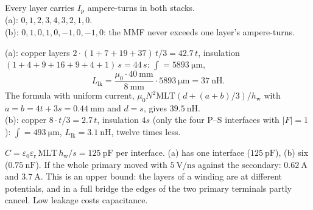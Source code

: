 


\begin{solutionblock}
	Every layer carries $I_\mathrm{p}$ ampere-turns in both stacks.\\
	(a): $0,1,2,3,4,3,2,1,0$.\\
	(b): $0,1,0,1,0,-1,0,-1,0$: the MMF never exceeds one layer's ampere-turns.
\end{solutionblock}


\begin{solutionblock}
	(a): copper layers $2\cdot(1+7+19+37)\,t/3=42.7\,t$, insulation $(1+4+9+16+9+4+1)\,s=44\,s$: $\int=\SI{5893}{\micro\metre}$,
	\begin{equation}
		L_\mathrm{lk}=\frac{\mu_0\cdot\SI{40}{\milli\metre}}{\SI{8}{\milli\metre}}\cdot\SI{5893}{\micro\metre}=\SI{37}{\nano\henry}.
	\end{equation}
	The formula with uniform current, $\mu_0N^2\mathrm{MLT}(d+(a+b)/3)/h_\mathrm{w}$ with $a=b=4t+3s=\SI{0.44}{\milli\metre}$ and $d=s$, gives $\SI{39.5}{\nano\henry}$.\\
	(b): copper $8\cdot t/3=2.7\,t$, insulation $4s$ (only the four P--S interfaces with $|F|=1$): $\int=\SI{493}{\micro\metre}$, $L_\mathrm{lk}=\SI{3.1}{\nano\henry}$, twelve times less.
\end{solutionblock}


\begin{solutionblock}
	$C=\varepsilon_0\varepsilon_\mathrm{r}\,\mathrm{MLT}\,h_\mathrm{w}/s=\SI{125}{\pico\farad}$ per interface. (a) has one interface ($\SI{125}{\pico\farad}$), (b) six ($\SI{0.75}{\nano\farad}$). If the whole primary moved with $\SI{5}{\volt\per\nano\second}$ against the secondary: $\SI{0.62}{\ampere}$ and $\SI{3.7}{\ampere}$. This is an upper bound: the layers of a winding are at different potentials, and in a full bridge the edges of the two primary terminals partly cancel. Low leakage costs capacitance.
\end{solutionblock}

